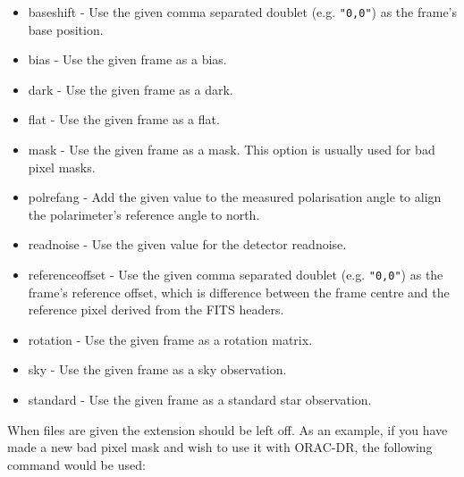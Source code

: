 \documentclass[twoside,11pt]{article}
\renewcommand{\_}{\texttt{\symbol{95}}}
\begin{document}
\begin{itemize}

\item

baseshift - Use the given comma separated doublet (e.g. \texttt{"0,0"})
as the frame's base position.


\item

bias - Use the given frame as a bias.


\item

dark - Use the given frame as a dark.


\item

flat - Use the given frame as a flat.


\item

mask - Use the given frame as a mask. This option is usually used
for bad pixel masks.


\item

polrefang - Add the given value to the measured polarisation angle
to align the polarimeter's reference angle to north.


\item

readnoise - Use the given value for the detector readnoise.


\item

referenceoffset - Use the given comma separated doublet (e.g.
\texttt{"0,0"}) as the frame's reference offset, which is difference between
the frame centre and the reference pixel derived from the FITS
headers.


\item

rotation - Use the given frame as a rotation matrix.


\item

sky - Use the given frame as a sky observation.


\item

standard - Use the given frame as a standard star observation.

\end{itemize}


When files are given the extension should be left off.  As an example,
if you have made a new bad pixel mask and wish to use it with ORAC-DR,
the following command would be used:
\end{document}

